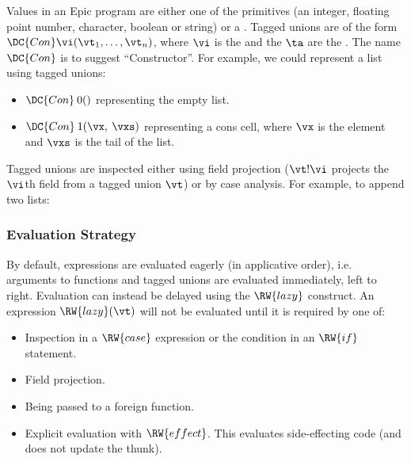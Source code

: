 Values in an Epic program are either one of the primitives (an
integer, floating point number, character, boolean or string) or a
. Tagged unions are of the form $\DC{Con}
\vi(\vt_1,\ldots,\vt_n)$, where $\vi$ is the  and the $\ta$
are the . The name $\DC{Con}$ is to suggest
``Constructor''. For example, we could represent a list using tagged
unions:

\begin{itemize}
\item $\DC{Con}\:0()$ representing the empty list.
\item $\DC{Con}\:1(\vx,\:\vxs)$ representing a cons cell, where $\vx$
  is the element and $\vxs$ is the tail of the list.
\end{itemize}

Tagged unions are inspected either using field projection ($\vt!\vi$
projects the $\vi$th field from a tagged union $\vt$) or by case
analysis. For example, to append two lists:


\subsubsection*{Evaluation Strategy}

By default, expressions are evaluated eagerly (in applicative order),
i.e. arguments to functions and tagged unions are evaluated
immediately, left to right. Evaluation can instead be delayed using
the $\RW{lazy}$ construct. An expression $\RW{lazy}(\vt)$ will not be
evaluated until it is required by one of:

\begin{itemize}
\item Inspection in a $\RW{case}$ expression or the condition in an
  $\RW{if}$ statement.
\item Field projection.
\item Being passed to a foreign function.
\item Explicit evaluation with $\RW{effect}$. This evaluates
  side-effecting code (and does not update the thunk).
\end{itemize}

